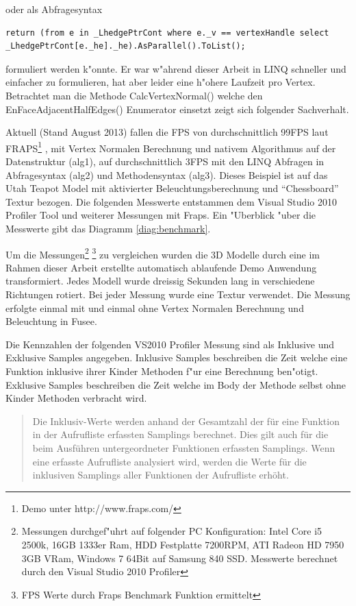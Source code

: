 \documentclass[pagesize, paper=a4, fontsize=12pt,titlepage=true, headings=small, headnosepline, abstractoff, liststotoc, nochapterprefix, plainheadsepline]{scrreprt}
\begin{document}
oder als Abfragesyntax
\begin{lstlisting}[label={code:alg2}]
return (from e in _LhedgePtrCont where e._v == vertexHandle select _LhedgePtrCont[e._he]._he).AsParallel().ToList();
\end{lstlisting}
 formuliert werden k"onnte. Er war w"ahrend dieser Arbeit in LINQ schneller und einfacher zu formulieren, hat aber leider eine h"ohere Laufzeit pro Vertex. Betrachtet man die Methode CalcVertexNormal() welche den EnFaceAdjacentHalfEdges() Enumerator einsetzt zeigt sich folgender Sachverhalt.

Aktuell (Stand August 2013) fallen die FPS von durchschnittlich 99FPS laut FRAPS\footnote{ Demo unter http://www.fraps.com/} , mit Vertex Normalen Berechnung und nativem Algorithmus auf der Datenstruktur (alg1\label{code:alg1}), auf durchschnittlich 3FPS mit den LINQ Abfragen in Abfragesyntax (alg2\label{code:alg2}) und Methodensyntax (alg3\label{code:alg3}). Dieses Beispiel ist auf das Utah Teapot Model mit aktivierter Beleuchtungsberechnung und "`Chessboard"' Textur bezogen. Die folgenden Messwerte entstammen dem Visual Studio 2010 Profiler Tool und weiterer Messungen mit Fraps. Ein "Uberblick "uber die Messwerte gibt das Diagramm \ref{diag:benchmark}.
\newline

Um die Messungen\footnote{Messungen durchgef"uhrt auf folgender PC Konfiguration: Intel Core i5 2500k, 16GB 1333er Ram, HDD Festplatte 7200RPM, ATI Radeon HD 7950 3GB VRam, Windows 7 64Bit auf Samsung 840 SSD. Messwerte berechnet durch den Visual Studio 2010 Profiler\label{fn-messungenPC}} \footnote{FPS Werte durch Fraps Benchmark Funktion ermittelt} zu vergleichen wurden die 3D Modelle durch eine im Rahmen dieser Arbeit erstellte automatisch ablaufende Demo Anwendung transformiert. Jedes Modell wurde dreissig Sekunden lang in verschiedene Richtungen rotiert. Bei jeder Messung wurde eine Textur verwendet. Die Messung erfolgte einmal mit und einmal ohne Vertex Normalen Berechnung und Beleuchtung in Fusee.
\newline

Die Kennzahlen der folgenden VS2010 Profiler Messung sind als Inklusive und Exklusive Samples angegeben. Inklusive Samples beschreiben die Zeit welche eine Funktion inklusive ihrer Kinder Methoden f"ur eine Berechnung ben"otigt. Exklusive Samples beschreiben die Zeit welche im Body der Methode selbst ohne Kinder Methoden verbracht wird.

\begin{quote}Die Inklusiv-Werte werden anhand der Gesamtzahl der f{\"u}r eine Funktion in der Aufrufliste erfassten Samplings berechnet. Dies gilt auch f{\"u}r die beim Ausf{\"u}hren untergeordneter Funktionen erfassten Samplings. Wenn eine erfasste Aufrufliste analysiert wird, werden die Werte f{\"u}r die inklusiven Samplings aller Funktionen der Aufrufliste erh{\"o}ht. \cite[Analyse von Leistungsdaten]{MicrosoftCReferenz.2013}\end{quote}
\end{document}
